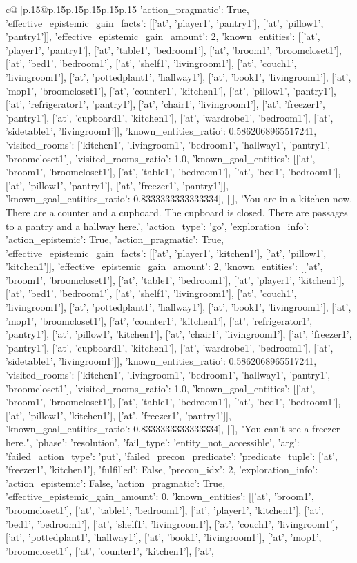 \documentclass{article}
\begin{document}
{\begin{supertabular}{c@{$\;$}|p{.15\linewidth}@{}p{.15\linewidth}p{.15\linewidth}p{.15\linewidth}p{.15\linewidth}p{.15\linewidth}}
{{{'action_pragmatic': True, 'effective_epistemic_gain_facts': [['at', 'player1', 'pantry1'], ['at', 'pillow1', 'pantry1']], 'effective_epistemic_gain_amount': 2, 'known_entities': [['at', 'player1', 'pantry1'], ['at', 'table1', 'bedroom1'], ['at', 'broom1', 'broomcloset1'], ['at', 'bed1', 'bedroom1'], ['at', 'shelf1', 'livingroom1'], ['at', 'couch1', 'livingroom1'], ['at', 'pottedplant1', 'hallway1'], ['at', 'book1', 'livingroom1'], ['at', 'mop1', 'broomcloset1'], ['at', 'counter1', 'kitchen1'], ['at', 'pillow1', 'pantry1'], ['at', 'refrigerator1', 'pantry1'], ['at', 'chair1', 'livingroom1'], ['at', 'freezer1', 'pantry1'], ['at', 'cupboard1', 'kitchen1'], ['at', 'wardrobe1', 'bedroom1'], ['at', 'sidetable1', 'livingroom1']], 'known_entities_ratio': 0.5862068965517241, 'visited_rooms': ['kitchen1', 'livingroom1', 'bedroom1', 'hallway1', 'pantry1', 'broomcloset1'], 'visited_rooms_ratio': 1.0, 'known_goal_entities': [['at', 'broom1', 'broomcloset1'], ['at', 'table1', 'bedroom1'], ['at', 'bed1', 'bedroom1'], ['at', 'pillow1', 'pantry1'], ['at', 'freezer1', 'pantry1']], 'known_goal_entities_ratio': 0.8333333333333334}}], [[], 'You are in a kitchen now. There are a counter and a cupboard. The cupboard is closed. There are passages to a pantry and a hallway here.', {'action_type': 'go', 'exploration_info': {'action_epistemic': True, 'action_pragmatic': True, 'effective_epistemic_gain_facts': [['at', 'player1', 'kitchen1'], ['at', 'pillow1', 'kitchen1']], 'effective_epistemic_gain_amount': 2, 'known_entities': [['at', 'broom1', 'broomcloset1'], ['at', 'table1', 'bedroom1'], ['at', 'player1', 'kitchen1'], ['at', 'bed1', 'bedroom1'], ['at', 'shelf1', 'livingroom1'], ['at', 'couch1', 'livingroom1'], ['at', 'pottedplant1', 'hallway1'], ['at', 'book1', 'livingroom1'], ['at', 'mop1', 'broomcloset1'], ['at', 'counter1', 'kitchen1'], ['at', 'refrigerator1', 'pantry1'], ['at', 'pillow1', 'kitchen1'], ['at', 'chair1', 'livingroom1'], ['at', 'freezer1', 'pantry1'], ['at', 'cupboard1', 'kitchen1'], ['at', 'wardrobe1', 'bedroom1'], ['at', 'sidetable1', 'livingroom1']], 'known_entities_ratio': 0.5862068965517241, 'visited_rooms': ['kitchen1', 'livingroom1', 'bedroom1', 'hallway1', 'pantry1', 'broomcloset1'], 'visited_rooms_ratio': 1.0, 'known_goal_entities': [['at', 'broom1', 'broomcloset1'], ['at', 'table1', 'bedroom1'], ['at', 'bed1', 'bedroom1'], ['at', 'pillow1', 'kitchen1'], ['at', 'freezer1', 'pantry1']], 'known_goal_entities_ratio': 0.8333333333333334}}], [[], "You can't see a freezer here.", {'phase': 'resolution', 'fail_type': 'entity_not_accessible', 'arg': {'failed_action_type': 'put', 'failed_precon_predicate': {'predicate_tuple': ['at', 'freezer1', 'kitchen1'], 'fulfilled': False, 'precon_idx': 2}}, 'exploration_info': {'action_epistemic': False, 'action_pragmatic': True, 'effective_epistemic_gain_amount': 0, 'known_entities': [['at', 'broom1', 'broomcloset1'], ['at', 'table1', 'bedroom1'], ['at', 'player1', 'kitchen1'], ['at', 'bed1', 'bedroom1'], ['at', 'shelf1', 'livingroom1'], ['at', 'couch1', 'livingroom1'], ['at', 'pottedplant1', 'hallway1'], ['at', 'book1', 'livingroom1'], ['at', 'mop1', 'broomcloset1'], ['at', 'counter1', 'kitchen1'], ['at', }}}
\end{supertabular}}
\end{document}
